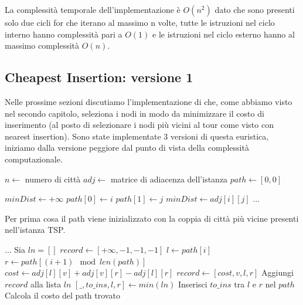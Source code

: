 \documentclass[a4paper,12pt]{report}
\begin{document}
La complessità temporale dell'implementazione è $O(n^2)$ dato che sono presenti solo due cicli for che iterano al massimo n volte, tutte le istruzioni nel ciclo interno hanno complessità pari a $O(1)$ e le istruzioni nel ciclo esterno hanno al massimo complessità $O(n)$.

\subsection{Cheapest Insertion: versione 1}
Nelle prossime sezioni discutiamo l'implementazione di  che, come abbiamo visto nel secondo capitolo, seleziona i nodi in modo da minimizzare il costo di inserimento (al posto di selezionare i nodi più vicini al tour come visto con nearest insertion). Sono state implementate 3 versioni di questa euristica, iniziamo dalla versione peggiore dal punto di vista della complessità computazionale.
\begin{tcolorbox}[colframe=black, colback=white, boxrule=0.5pt, title=Cheapest Insertion Versione 1, coltitle=black, fonttitle=\bfseries, colbacktitle=white, breakable]
  \begin{algorithmic}[1]
    \State $n \gets$ numero di città
    \State $adj \gets$ matrice di adiacenza dell'istanza
    \State $path \gets [0, 0]$
    
    \State $minDist \gets +\infty$
          \State $path[0] \gets i$
          \State $path[1] \gets j$
          \State $minDist \gets adj[i][j]$
        \EndIf
      \EndFor
    \EndFor
    \State ...
  \end{algorithmic}
\end{tcolorbox}
Per prima cosa il path viene inizializzato con la coppia di città più vicine presenti nell'istanza TSP.
\begin{tcolorbox}[colframe=black, colback=white, boxrule=0.5pt, title=Cheapest Insertion Versione 1, coltitle=black, fonttitle=\bfseries, colbacktitle=white, breakable]
  \begin{algorithmic}[1]
    \State ...
      \State Sia $ln = []$
        \State $record \gets [+\infty, -1, -1, -1]$
          \State $l \gets path[i]$
          \State $r \gets path[(i + 1) \mod len(path)]$
          \State $cost \gets adj[l][v] + adj[v][r] - adj[l][r]$
            \State $record \gets [cost, v, l, r]$
          \EndIf
        \EndFor
        \State Aggiungi $record$ alla lista $ln$
      \EndFor
      \State $[\_, to\_ins, l, r] \gets min(ln)$
      \State Inserisci $to\_ins$ tra $l$ e $r$ nel $path$
    \EndWhile
    \State Calcola il costo del path trovato
  \end{algorithmic}
\end{tcolorbox}
\end{document}
